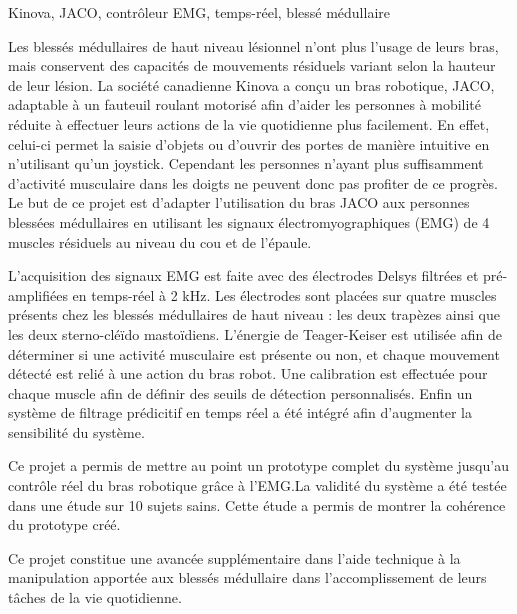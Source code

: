 \documentclass[letterpaper, twoside, 12pt, memoire, creativecommons, hyperref]{thETS}
\begin{document}
\begin{sommaire}{Kinova, JACO, contrôleur EMG, temps-réel, blessé médullaire}

Les blessés médullaires de haut niveau lésionnel n’ont plus l’usage de leurs bras, mais conservent des capacités de mouvements résiduels variant selon la hauteur de leur lésion. La société canadienne Kinova a conçu un bras robotique, JACO, adaptable à un fauteuil roulant motorisé afin d’aider les personnes à mobilité réduite à effectuer leurs actions de la vie quotidienne plus facilement. En effet, celui-ci permet la saisie d’objets ou d’ouvrir des portes de manière intuitive en n’utilisant qu’un joystick. Cependant les personnes n’ayant plus suffisamment d’activité musculaire dans les doigts ne peuvent donc pas profiter de ce progrès. Le but de ce projet est d’adapter l’utilisation du bras JACO aux personnes blessées médullaires en utilisant les signaux électromyographiques (EMG) de 4 muscles résiduels au niveau du cou et de l’épaule. 

L’acquisition des signaux EMG est faite avec des électrodes Delsys filtrées et pré-amplifiées en temps-réel à 2 kHz. Les électrodes sont placées sur quatre muscles présents chez les blessés médullaires de haut niveau : les deux trapèzes ainsi que les deux sterno-cléïdo mastoïdiens. L’énergie de Teager-Keiser est utilisée afin de déterminer si une activité musculaire est présente ou non, et chaque mouvement détecté est relié à une action du bras robot. Une calibration est effectuée pour chaque muscle afin de définir des seuils de détection personnalisés. Enfin un système de filtrage prédicitif en temps réel a été intégré afin d’augmenter la sensibilité du système.

Ce projet a permis de mettre au point un prototype complet du système jusqu'au contrôle réel du bras robotique grâce à l'EMG.La validité du système a été testée dans une étude sur 10 sujets sains. Cette étude a permis de montrer la cohérence du prototype créé. 

Ce projet constitue une avancée supplémentaire dans l’aide technique à la manipulation apportée aux blessés médullaire dans l’accomplissement de leurs tâches de la vie quotidienne. 



\end{sommaire}
\end{document}

